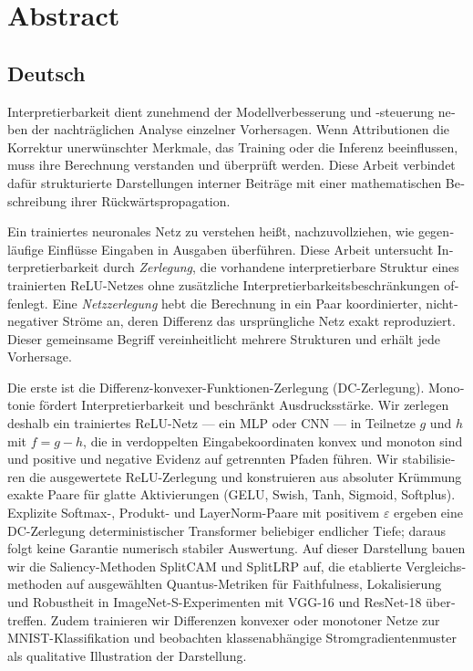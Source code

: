 \chapter*{Abstract}
\begin{otherlanguage}{ngerman}
\section*{Deutsch}
Interpretierbarkeit dient zunehmend der Modellverbesserung und -steuerung neben der nachträglichen Analyse einzelner Vorhersagen. Wenn Attributionen die Korrektur unerwünschter Merkmale, das Training oder die Inferenz beeinflussen, muss ihre Berechnung verstanden und überprüft werden. Diese Arbeit verbindet dafür strukturierte Darstellungen interner Beiträge mit einer mathematischen Beschreibung ihrer Rückwärtspropagation.

Ein trainiertes neuronales Netz zu verstehen hei\ss{}t, nachzuvollziehen, wie gegenl\"aufige Einfl\"usse Eingaben in Ausgaben \"uberf\"uhren. Diese Arbeit untersucht Interpretierbarkeit durch \emph{Zerlegung}, die vorhandene interpretierbare Struktur eines trainierten ReLU-Netzes ohne zus\"atzliche Interpretierbarkeitsbeschr\"ankungen offenlegt. Eine \emph{Netzzerlegung} hebt die Berechnung in ein Paar koordinierter, nichtnegativer Str\"ome an, deren Differenz das urspr\"ungliche Netz exakt reproduziert. Dieser gemeinsame Begriff vereinheitlicht mehrere Strukturen und erh\"alt jede Vorhersage.

Die erste ist die Differenz-konvexer-Funktionen-Zerlegung (DC-Zerlegung). Monotonie f\"ordert Interpretierbarkeit und beschr\"ankt Ausdrucksst\"arke. Wir zerlegen deshalb ein trainiertes ReLU-Netz --- ein MLP oder CNN --- in Teilnetze $g$ und $h$ mit $f = g - h$, die in verdoppelten Eingabekoordinaten konvex und monoton sind und positive und negative Evidenz auf getrennten Pfaden f\"uhren. Wir stabilisieren die ausgewertete ReLU-Zerlegung und konstruieren aus absoluter Kr\"ummung exakte Paare f\"ur glatte Aktivierungen (GELU, Swish, Tanh, Sigmoid, Softplus). Explizite Softmax-, Produkt- und LayerNorm-Paare mit positivem $\varepsilon$ ergeben eine DC-Zerlegung deterministischer Transformer beliebiger endlicher Tiefe; daraus folgt keine Garantie numerisch stabiler Auswertung. Auf dieser Darstellung bauen wir die Saliency-Methoden SplitCAM und SplitLRP auf, die etablierte Vergleichsmethoden auf ausgew\"ahlten Quantus-Metriken f\"ur Faithfulness, Lokalisierung und Robustheit in ImageNet-S-Experimenten mit VGG-16 und ResNet-18 \"ubertreffen. Zudem trainieren wir Differenzen konvexer oder monotoner Netze zur MNIST-Klassifikation und beobachten klassenabh\"angige Stromgradientenmuster als qualitative Illustration der Darstellung.


\end{otherlanguage}
